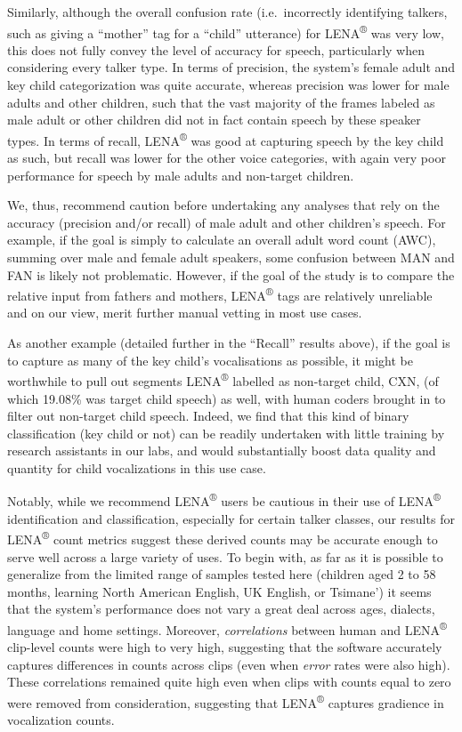\documentclass[english,table,man,floatsintext]{apa6}
\begin{document}
Similarly, although the overall confusion rate (i.e.~incorrectly identifying talkers, such as giving a \enquote{mother} tag for a \enquote{child} utterance) for LENA\textsuperscript{®} was very low, this does not fully convey the level of accuracy for speech, particularly when considering every talker type. In terms of precision, the system's female adult and key child categorization was quite accurate, whereas precision was lower for male adults and other children, such that the vast majority of the frames labeled as male adult or other children did not in fact contain speech by these speaker types. In terms of recall, LENA\textsuperscript{®} was good at capturing speech by the key child as such, but recall was lower for the other voice categories, with again very poor performance for speech by male adults and non-target children.

We, thus, recommend caution before undertaking any analyses that rely on the accuracy (precision and/or recall) of male adult and other children's speech. For example, if the goal is simply to calculate an overall adult word count (AWC), summing over male and female adult speakers, some confusion between MAN and FAN is likely not problematic. However, if the goal of the study is to compare the relative input from fathers and mothers, LENA\textsuperscript{®} tags are relatively unreliable and on our view, merit further manual vetting in most use cases.

As another example (detailed further in the \enquote{Recall} results above), if the goal is to capture as many of the key child's vocalisations as possible, it might be worthwhile to pull out segments LENA\textsuperscript{®} labelled as non-target child, CXN, (of which 19.08\% was target child speech) as well, with human coders brought in to filter out non-target child speech. Indeed, we find that this kind of binary classification (key child or not) can be readily undertaken with little training by research assistants in our labs, and would substantially boost data quality and quantity for child vocalizations in this use case.

Notably, while we recommend LENA\textsuperscript{®} users be cautious in their use of LENA\textsuperscript{®} identification and classification, especially for certain talker classes, our results for LENA\textsuperscript{®} count metrics suggest these derived counts may be accurate enough to serve well across a large variety of uses. To begin with, as far as it is possible to generalize from the limited range of samples tested here (children aged 2 to 58 months, learning North American English, UK English, or Tsimane') it seems that the system's performance does not vary a great deal across ages, dialects, language and home settings. Moreover, \emph{correlations} between human and LENA\textsuperscript{®} clip-level counts were high to very high, suggesting that the software accurately captures differences in counts across clips (even when \emph{error} rates were also high). These correlations remained quite high even when clips with counts equal to zero were removed from consideration, suggesting that LENA\textsuperscript{®} captures gradience in vocalization counts.
\end{document}
